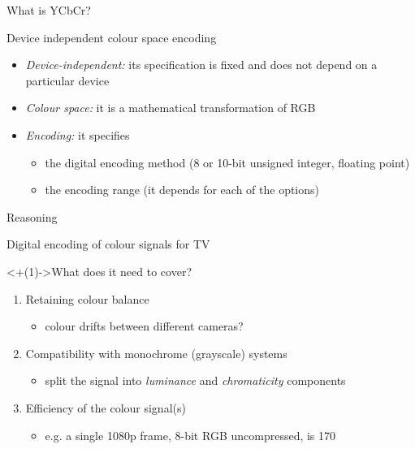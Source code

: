 \documentclass[aspectratio=169]{fireshonks}
\begin{document}
\begin{frame}{What is YCbCr?}
  \begin{center}
    Device independent colour space encoding
  \end{center}

  \begin{itemize}[<+(1)->]
    \item \emph{Device-independent:} its specification is fixed and does not depend on a particular device
    \item \emph{Colour space:} it is a mathematical transformation of RGB
    \item \emph{Encoding:} it specifies
          \begin{itemize}
            \item the digital encoding method (8 or 10-bit unsigned integer, floating point)
            \item the encoding range (it depends for each of the options)
          \end{itemize}
  \end{itemize}
\end{frame}
\begin{frame}{Reasoning}
  \begin{center}
    Digital encoding of colour signals for TV
  \end{center}

  \uncover<+(1)->{What does it need to cover? \autocite{tooms}}
  \begin{enumerate}[<+(1)->]
    \item Retaining colour balance
          \begin{itemize}
            \item colour drifts between different cameras? 
          \end{itemize}
    \item Compatibility with monochrome (grayscale) systems
          \begin{itemize}
            \item split the signal into \emph{luminance} and \emph{chromaticity} components
          \end{itemize}
    \item Efficiency of the colour signal(s)
          \begin{itemize}
            \item e.g. a single 1080p frame, 8-bit RGB uncompressed, is \SI{170}{\mega\byte}
          \end{itemize}
  \end{enumerate}
\end{frame}
\end{document}
